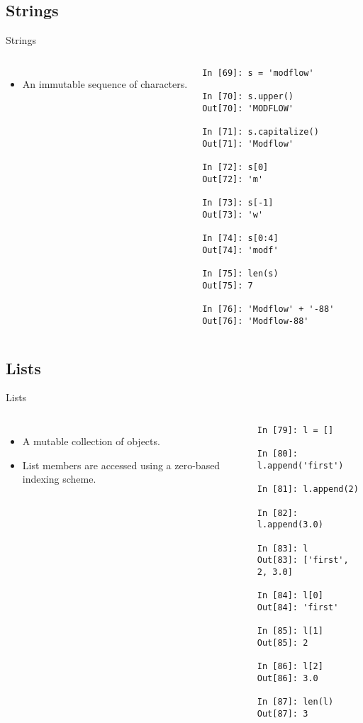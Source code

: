 \documentclass{beamer}
\begin{document}
\subsection{Strings}

\begin{frame}[fragile]{Strings}
\begin{columns}[c]
\column{2.5in}
\begin{itemize}
\item{An immutable sequence of characters.}
\end{itemize}

\column{2.5in}
\tiny
\begin{lstlisting}
In [69]: s = 'modflow'

In [70]: s.upper()
Out[70]: 'MODFLOW'

In [71]: s.capitalize()
Out[71]: 'Modflow'

In [72]: s[0]
Out[72]: 'm'

In [73]: s[-1]
Out[73]: 'w'

In [74]: s[0:4]
Out[74]: 'modf'

In [75]: len(s)
Out[75]: 7

In [76]: 'Modflow' + '-88'
Out[76]: 'Modflow-88'
\end{lstlisting}
\end{columns}
\end{frame}


\subsection{Lists}
\begin{frame}[fragile]{Lists}
\begin{columns}[c]
\column{2.5in}
\begin{itemize}
\item{A mutable collection of objects.}
\item{List members are accessed using a zero-based indexing scheme.}
\end{itemize}

\column{2.5in}
\tiny
\begin{lstlisting}
In [79]: l = []

In [80]: l.append('first')

In [81]: l.append(2)

In [82]: l.append(3.0)

In [83]: l
Out[83]: ['first', 2, 3.0]

In [84]: l[0]
Out[84]: 'first'

In [85]: l[1]
Out[85]: 2

In [86]: l[2]
Out[86]: 3.0

In [87]: len(l)
Out[87]: 3
\end{lstlisting}
\end{columns}
\end{frame}
\end{document}
